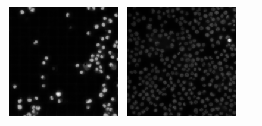 \begin{figure}[H]
\begin{tabularx}{\textwidth}{YYYY}
            \includegraphics{bilder/lightning-conditions/lightning-1.png} & \includegraphics{bilder/lightning-conditions/lightning-2.png} &

\end{tabularx}
\end{figure}
